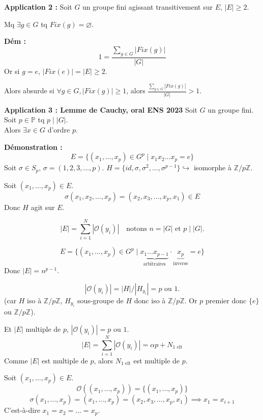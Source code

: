 \begin{exemple}
\textbf{Application 2 :} Soit $G$ un groupe fini agissant transitivement sur $E$, $|E| \geqslant 2$.

Mq $\exists g \in G$ tq $Fix(g) = \varnothing$.
\end{exemple}

\noindent \textbf{Dém :}
\[ 1 = \frac{\sum_{g \in G} |Fix(g)|}{|G|} \]
Or si $g=e$, $|Fix(e)| = |E| \geqslant 2$.

Alors absurde si $\forall g \in G, |Fix(g)| \geqslant 1$, alors $\frac{\sum_{g \in G} |Fix(g)|}{|G|} > 1$.

\vspace{0.5cm}

\begin{exemple}
    \textbf{Application 3 : Lemme de Cauchy, oral ENS 2023}
Soit $G$ un groupe fini. Soit $p \in \mathbb{P}$ tq $p \mid |G|$.\\
Alors $\exists x \in G$ d'ordre $p$.
\end{exemple}

\noindent \textbf{Démonstration :}
\[ E = \{ (x_1, \dots, x_p) \in G^p \mid x_1 x_2 \dots x_p = e \} \]
Soit $\sigma \in S_p$, $\sigma = (1, 2, 3, \dots, p)$. $H = \{ id, \sigma, \sigma^2, \dots, \sigma^{p-1} \} \hookrightarrow$ isomorphe à $\mathbb{Z}/p\mathbb{Z}$.

Soit $(x_1, \dots, x_p) \in E$.
\[ \sigma(x_1, x_2, \dots, x_p) = (x_2, x_3, \dots, x_p, x_1) \in E \]
Donc $H$ agit sur $E$.

\[ |E| = \sum_{i=1}^N |\mathcal{O}(y_i)| \quad \text{notons } n = |G| \text{ et } p \mid |G|. \]

\[ E = \{ (x_1, \dots, x_p) \in G^p \mid \underbrace{x_1 \dots x_{p-1}}_{\text{arbitraires}} \cdot \underbrace{x_p}_{\text{inverse}} = e \} \]
Donc $|E| = n^{p-1}$.

\[ |\mathcal{O}(y_i)| = |H|/|H_{y_i}| = p \text{ ou } 1. \]
(car $H$ iso à $\mathbb{Z}/p\mathbb{Z}$, $H_{y_i}$ sous-groupe de $H$ donc iso à $\mathbb{Z}/p\mathbb{Z}$. Or $p$ premier donc $\{e\}$ ou $\mathbb{Z}/p\mathbb{Z}$).

Et $|E|$ multiple de $p$, $|\mathcal{O}(y_i)| = p \text{ ou } 1$.
\[ |E| = \sum_{i=1}^N |\mathcal{O}(y_i)| = \alpha p + N_{\text{1 elt}} \]
Comme $|E|$ est multiple de $p$, alors $N_{\text{1 elt}}$ est multiple de $p$.

Soit $(x_1, \dots, x_p) \in E$.
\[ \mathcal{O}((x_1, \dots, x_p)) = \{(x_1, \dots, x_p)\} \]
\[ \sigma(x_1, \dots, x_p) = (x_1, \dots, x_p) = (x_2, x_3, \dots, x_p, x_1) \implies x_1 = x_{i+1} \]
C'est-à-dire $x_1 = x_2 = \dots = x_p$.

